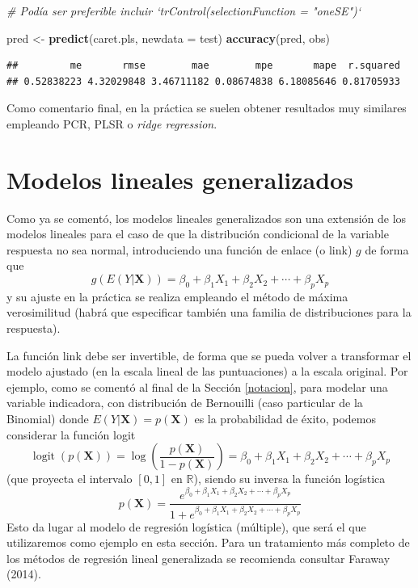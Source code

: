 \documentclass[
]{book}
\newenvironment{Shaded}{\begin{snugshade}}{\end{snugshade}}
\newcommand{\CommentTok}[1]{\textcolor[rgb]{0.56,0.35,0.01}{\textit{#1}}}
\newcommand{\DataTypeTok}[1]{\textcolor[rgb]{0.13,0.29,0.53}{#1}}
\newcommand{\KeywordTok}[1]{\textcolor[rgb]{0.13,0.29,0.53}{\textbf{#1}}}
\newcommand{\NormalTok}[1]{#1}
\newcommand{\StringTok}[1]{\textcolor[rgb]{0.31,0.60,0.02}{#1}}
\theoremstyle{break}
\theoremstyle{definition}
\theoremstyle{definition}
\theoremstyle{definition}
\theoremstyle{remark}
\begin{document}
\begin{Shaded}
\begin{Highlighting}[]
\CommentTok{# Podía ser preferible incluir `trControl(selectionFunction = "oneSE")`}

\NormalTok{pred <-}\StringTok{ }\KeywordTok{predict}\NormalTok{(caret.pls, }\DataTypeTok{newdata =}\NormalTok{ test)}
\KeywordTok{accuracy}\NormalTok{(pred, obs)}
\end{Highlighting}
\end{Shaded}

\begin{verbatim}
##         me       rmse        mae        mpe       mape  r.squared 
## 0.52838223 4.32029848 3.46711182 0.08674838 6.18085646 0.81705933
\end{verbatim}

Como comentario final, en la práctica se suelen obtener resultados muy similares empleando PCR, PLSR o \emph{ridge regression}.

\hypertarget{reg-glm}{%
\section{Modelos lineales generalizados}\label{reg-glm}}

Como ya se comentó, los modelos lineales generalizados son una extensión de los modelos lineales para el caso de que la distribución condicional de la variable respuesta no sea normal, introduciendo una función de enlace (o link) \(g\) de forma que
\[g\left(E(Y | \mathbf{X} )\right) = \beta_{0}+\beta_{1}X_{1}+\beta_{2}X_{2}+\cdots+\beta_{p}X_{p}\]
y su ajuste en la práctica se realiza empleando el método de máxima verosimilitud (habrá que especificar también una familia de distribuciones para la respuesta).

La función link debe ser invertible, de forma que se pueda volver a transformar el modelo ajustado (en la escala lineal de las puntuaciones) a la escala original.
Por ejemplo, como se comentó al final de la Sección \ref{notacion}, para modelar una variable indicadora, con distribución de Bernouilli (caso particular de la Binomial) donde \(E(Y | \mathbf{X} ) = p(\mathbf{X})\) es la probabilidad de éxito, podemos considerar la función logit
\[\operatorname{logit}(p(\mathbf{X}))=\log\left( \frac{p(\mathbf{X})}{1-p(\mathbf{X})} \right) = \beta_{0}+\beta_{1}X_{1}+\beta_{2}X_{2}+\cdots+\beta_{p}X_{p}\]
(que proyecta el intervalo \([0, 1]\) en \(\mathbb{R}\)), siendo su inversa la función logística
\[p(\mathbf{X}) = \frac{e^{\beta_{0}+\beta_{1}X_{1}+\beta_{2}X_{2}+\cdots+\beta_{p}X_{p}}}{1 + e^{\beta_{0}+\beta_{1}X_{1}+\beta_{2}X_{2}+\cdots+\beta_{p}X_{p}}}\]
Esto da lugar al modelo de regresión logística (múltiple), que será el que utilizaremos como ejemplo en esta sección.
Para un tratamiento más completo de los métodos de regresión lineal generalizada se recomienda consultar Faraway (2014).
\end{document}
